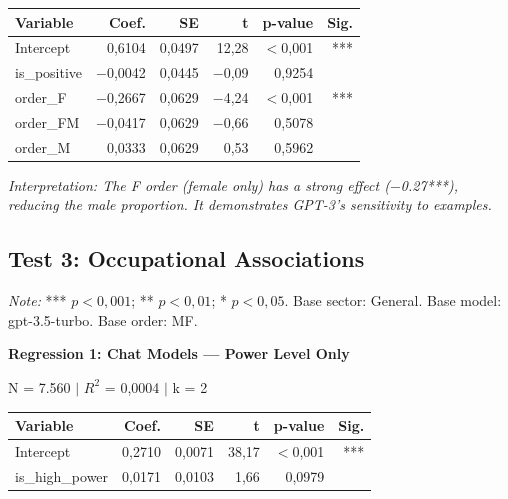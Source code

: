 \documentclass[jair,11pt,letterpaper]{article}
\begin{document}
\begin{table}[H]
\centering
\begin{tabular}{lrrrrr}
\toprule
\textbf{Variable} & \textbf{Coef.} & \textbf{SE} & \textbf{t} & \textbf{p-value} & \textbf{Sig.} \\
\midrule
Intercept & 0,6104 & 0,0497 & 12,28 & $<$0,001 & *** \\
is\_positive & $-$0,0042 & 0,0445 & $-$0,09 & 0,9254 & \\
order\_F & $-$0,2667 & 0,0629 & $-$4,24 & $<$0,001 & *** \\
order\_FM & $-$0,0417 & 0,0629 & $-$0,66 & 0,5078 & \\
order\_M & 0,0333 & 0,0629 & 0,53 & 0,5962 & \\
\bottomrule
\end{tabular}
\end{table}
\noindent\textit{Interpretation: The F order (female only) has a strong effect
($-$0.27***), reducing the male proportion. It demonstrates GPT-3's
sensitivity to examples.}


\subsection{Test 3: Occupational Associations}


\textit{Note:} *** $p < 0,001$; ** $p < 0,01$; * $p < 0,05$. Base sector:
General. Base model: gpt-3.5-turbo. Base order: MF.

\vspace{0.5cm}
\noindent\textbf{Regression 1: Chat Models --- Power Level Only}

\noindent N = 7.560 $|$ $R^2$ = 0,0004 $|$ k = 2

\begin{table}[H]
\centering
\begin{tabular}{lrrrrr}
\toprule
\textbf{Variable} & \textbf{Coef.} & \textbf{SE} & \textbf{t} & \textbf{p-value} & \textbf{Sig.} \\
\midrule
Intercept & 0,2710 & 0,0071 & 38,17 & $<$0,001 & *** \\
is\_high\_power & 0,0171 & 0,0103 & 1,66 & 0,0979 & \\
\bottomrule
\end{tabular}
\end{table}
\end{document}
